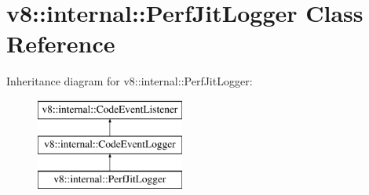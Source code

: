 \hypertarget{classv8_1_1internal_1_1PerfJitLogger}{}\section{v8\+:\+:internal\+:\+:Perf\+Jit\+Logger Class Reference}
\label{classv8_1_1internal_1_1PerfJitLogger}
Inheritance diagram for v8\+:\+:internal\+:\+:Perf\+Jit\+Logger\+:\begin{figure}[H]
\begin{center}
\leavevmode
\includegraphics[height=3.000000cm]{classv8_1_1internal_1_1PerfJitLogger}
\end{center}
\end{figure}
